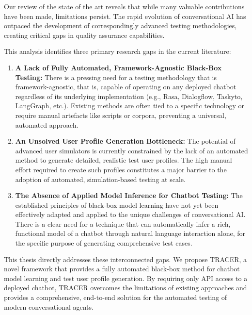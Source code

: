 Our review of the state of the art
reveals that while many valuable contributions have been made,
limitations persist.
The rapid evolution of conversational AI
has outpaced the development of
correspondingly advanced testing methodologies,
creating critical gaps in quality assurance capabilities.

This analysis identifies three primary research gaps in the current literature:
\begin{enumerate}
    \item \textbf{A Lack of Fully Automated, Framework-Agnostic Black-Box Testing:}
      There is a pressing need for a testing methodology
      that is framework-agnostic, that is,
      capable of operating on any deployed chatbot
      regardless of its underlying implementation
      (e.g., Rasa, Dialogflow, Taskyto, LangGraph, etc.).
      Existing methods are often tied to a specific technology
      or require manual artefacts like scripts or corpora,
      preventing a universal, automated approach.

    \item \textbf{An Unsolved User Profile Generation Bottleneck:}
      The potential of advanced user simulators
      is currently constrained by the lack of an automated method
      to generate detailed, realistic test user profiles.
      The high manual effort required to create such profiles
      constitutes a major barrier
      to the adoption of automated, simulation-based testing at scale.

    \item \textbf{The Absence of Applied Model Inference for Chatbot Testing:}
      The established principles of black-box model learning
      have not yet been effectively adapted and applied
      to the unique challenges of conversational \ac{AI}.
      There is a clear need for a technique
      that can automatically infer a rich, functional model of a chatbot
      through natural language interaction alone,
      for the specific purpose of generating comprehensive test cases.

\end{enumerate}

This thesis directly addresses these interconnected gaps.
We propose \ac{TRACER}, a novel framework
that provides a fully automated black-box method
for chatbot model learning and test user profile generation.
By requiring only \ac{API} access to a deployed chatbot,
\ac{TRACER} overcomes the limitations of existing approaches
and provides a comprehensive, end-to-end solution
for the automated testing of modern conversational agents.
